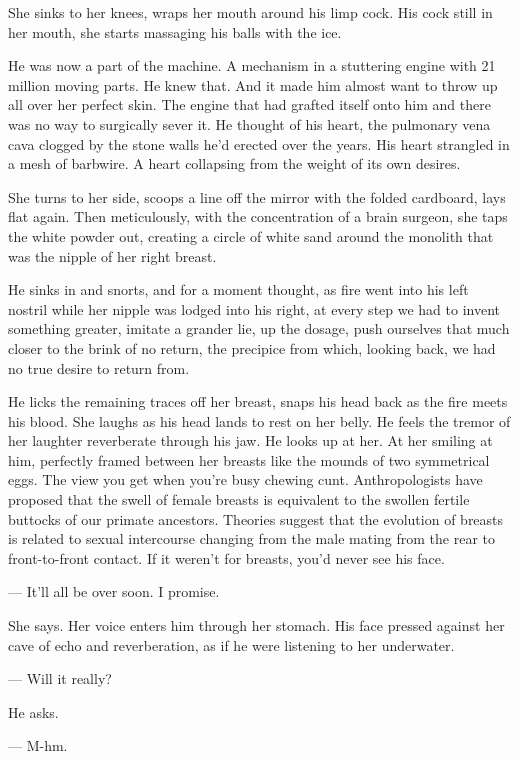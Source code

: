 \documentclass[11pt]{article}
\begin{document}
	She sinks to her knees, wraps her mouth around his limp cock. His cock
still in her mouth, she starts massaging his balls with the ice.

	He was now a part of the machine. A mechanism in a stuttering engine with 
21 million moving parts. He knew that. And it made him almost want to throw up 
all over her perfect skin. The engine that had grafted itself onto him and 
there was no way to surgically sever it. He thought of his heart, the pulmonary 
vena cava clogged by the stone walls he'd erected over the years. His heart 
strangled in a mesh of barbwire. A heart collapsing from the weight of its own 
desires.

	She turns to her side, scoops a line off the mirror with the folded 
cardboard, lays flat again. Then meticulously, with the concentration of a 
brain surgeon, she taps the white powder out, creating a circle of white sand 
around the monolith that was the nipple of her right breast.

	He sinks in and snorts, and for a moment thought, as fire went into his 
left nostril while her nipple was lodged into his right, at every step we had 
to invent something greater, imitate a grander lie, up the dosage, push 
ourselves that much closer to the brink of no return, the precipice from which, 
looking back, we had no true desire to return from.

	He licks the remaining traces off her breast, snaps his head back as the 
fire meets his blood. She laughs as his head lands to rest on her belly. He 
feels the tremor of her laughter reverberate through his jaw. He looks up at 
her. At her smiling at him, perfectly framed between her breasts like the 
mounds of two symmetrical eggs. The view you get when you're busy chewing cunt. 
Anthropologists have proposed that the swell of female breasts is equivalent to 
the swollen fertile buttocks of our primate ancestors. Theories suggest that 
the evolution of breasts is related to sexual intercourse changing from the 
male mating from the rear to front-to-front contact. If it weren't for breasts, 
you'd never see his face.

	--- It'll all be over soon. I promise.

	She says. Her voice enters him through her stomach. His face pressed 
against her cave of echo and reverberation, as if he were listening to her 
underwater.

	--- Will it really?

	He asks.

	--- M-hm.
\end{document}
